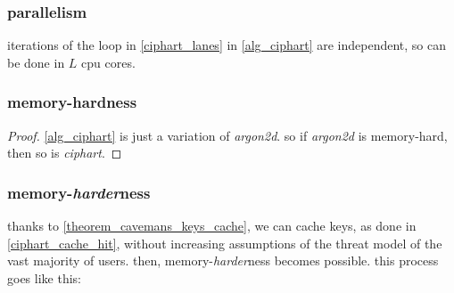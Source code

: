 \documentclass[twocolumn]{article}
\begin{document}
\subsubsection{parallelism}
iterations of the loop in \cref{ciphart_lanes} in \cref{alg_ciphart}
are independent, so can be done in $L$ cpu cores.

\subsubsection{memory-hardness}
\begin{proof}
    \cref{alg_ciphart} is just a variation of \emph{argon2d}.  so if
    \emph{argon2d} is memory-hard, then so is \emph{ciphart}.
\end{proof}


\subsubsection{memory-\emph{harder}ness}
thanks to \cref{theorem_cavemans_keys_cache}, we can cache keys, as done in
\cref{ciphart_cache_hit}, without increasing assumptions of the threat
model of the vast majority of users.  then, memory-\emph{harder}ness
becomes possible.  this process goes like this:
\end{document}
